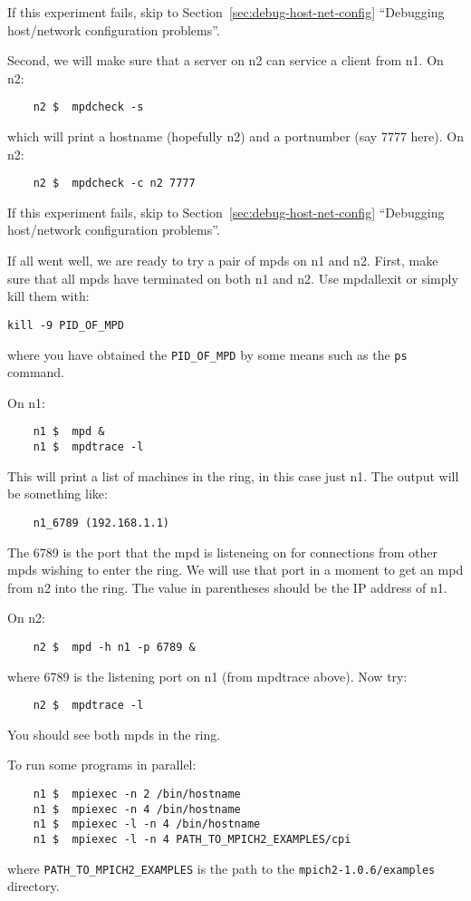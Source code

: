 \documentclass[dvipdfm,11pt]{article}
\begin{document}
\begin{enumerate}
If this experiment fails, skip to Section~\ref{sec:debug-host-net-config}
``Debugging host/network configuration problems''.

Second, we will make sure that a server on n2 can service a client from n1.
On n2:
\begin{verbatim}
    n2 $  mpdcheck -s
\end{verbatim}
which will print a hostname (hopefully n2) and a portnumber (say 7777 here).
On n2:
\begin{verbatim}
    n2 $  mpdcheck -c n2 7777
\end{verbatim}

If this experiment fails, skip to Section~\ref{sec:debug-host-net-config}
``Debugging host/network configuration problems''.

If all went well, we are ready to try a pair of mpds on n1 and n2.
First, make sure that all mpds have terminated on both n1 and n2.  Use
mpdallexit or simply kill them with:
\begin{verbatim}
kill -9 PID_OF_MPD
\end{verbatim}
where you have obtained the \texttt{PID\_OF\_MPD} by some means such as the \texttt{ps} command.

On n1:
\begin{verbatim}
    n1 $  mpd &
    n1 $  mpdtrace -l
\end{verbatim}
This will print a list of machines in the ring, in this case just n1.
The output will be something like:
\begin{verbatim}
    n1_6789 (192.168.1.1)
\end{verbatim}
The 6789 is the port that the mpd is listeneing on for connections from other
mpds wishing to enter the ring.  We will use that port in a moment to get an mpd
from n2 into the ring.  The value in parentheses should be the IP address of n1.

On n2:
\begin{verbatim}
    n2 $  mpd -h n1 -p 6789 &
\end{verbatim}
where 6789 is the listening port on n1 (from mpdtrace above).
Now try:
\begin{verbatim}
    n2 $  mpdtrace -l
\end{verbatim}
You should see both mpds in the ring.

To run some programs in parallel:
\begin{verbatim}
    n1 $  mpiexec -n 2 /bin/hostname
    n1 $  mpiexec -n 4 /bin/hostname
    n1 $  mpiexec -l -n 4 /bin/hostname
    n1 $  mpiexec -l -n 4 PATH_TO_MPICH2_EXAMPLES/cpi
\end{verbatim}
where \texttt{PATH\_TO\_MPICH2\_EXAMPLES} is the path to the
\texttt{mpich2-1.0.6/examples} directory.


\end{enumerate}
\end{document}
